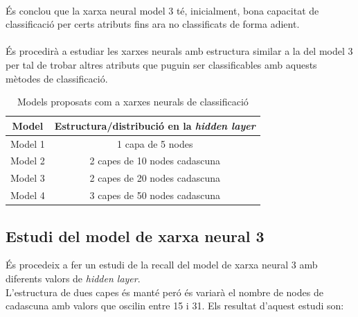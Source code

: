 \documentclass[a4paper, 11pt]{article}
\begin{document}
\\
És conclou que la xarxa neural model 3 té, inicialment, bona capacitat de classificació per certs atributs fins ara no classificats de forma adient.\\\\
És procedirà a estudiar les xarxes neurals amb estructura similar a la del model 3 per tal de trobar altres atributs que puguin ser classificables amb aquests mètodes de classificació.\\
\begin{table}[h]
    \centering
    \begin{tabular}{c|c}
        \textbf{Model} & \textbf{Estructura/distribució en la \textit{hidden layer}} \\ \hline \hline
        Model 1 & 1 capa de 5 nodes\\ \hline
        Model 2 & 2 capes de 10 nodes cadascuna \\ \hline
        Model 3 & 2 capes de 20 nodes cadascuna \\ \hline
        Model 4 & 3 capes de 50 nodes cadascuna \\ 
    \end{tabular}
    \caption{Models proposats com a xarxes neurals de classificació}
    \label{tab:my_label}
\end{table}
\newpage
\subsection{Estudi del model de xarxa neural 3}
És procedeix a fer un estudi de la recall del model de xarxa neural 3 amb diferents valors de \textit{hidden layer}.\\
L'estructura de dues capes és manté peró és variarà el nombre de nodes de cadascuna amb valors que oscilin entre 15 i 31.
Els resultat d'aquest estudi son:
\end{document}
